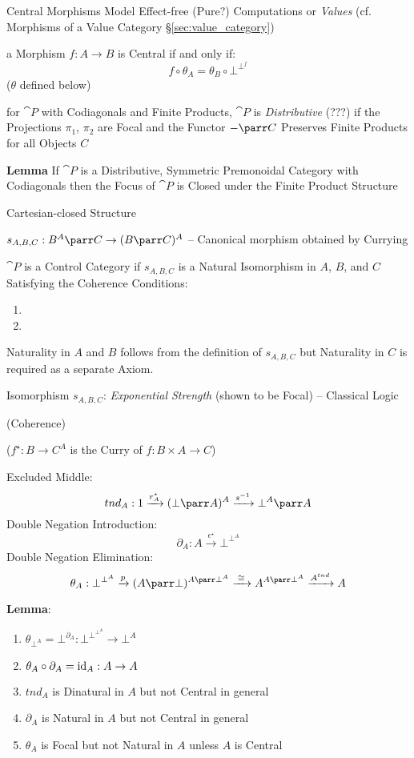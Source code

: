 Central Morphisms Model Effect-free (Pure?) Computations or
\emph{Values} (cf. Morphisms of a Value Category
\S\ref{sec:value_category})

a Morphism $f : A \rightarrow B$ is Central if and only if:
\[
  f \circ \theta_A = \theta_B \circ \bot^{\bot^f}
\]
($\theta$ defined below)

for $\cat{P}$ with Codiagonals and Finite Products, $\cat{P}$ is
\emph{Distributive} (???) if the Projections $\pi_1$, $\pi_2$ are
Focal and the Functor $-\parr C$ Preserves Finite Products for all
Objects $C$ %

\textbf{Lemma} If $\cat{P}$ is a Distributive, Symmetric Premonoidal
Category with Codiagonals then the Focus of $\cat{P}$ is Closed under
the Finite Product Structure

Cartesian-closed Structure

$s_{A,B,C} : B^A \parr C \rightarrow (B \parr C)^A$ -- Canonical
morphism obtained by Currying %

$\cat{P}$ is a Control Category if $s_{A,B,C}$ is a Natural
Isomorphism in $A$, $B$, and $C$ Satisfying the Coherence Conditions:
\begin{enumerate}
  \item
  \item
\end{enumerate}

\fist Naturality in $A$ and $B$ follows from the definition of
$s_{A,B,C}$ but Naturality in $C$ is required as a separate Axiom.

Isomorphism $s_{A,B,C}$: \emph{Exponential Strength} (shown to be
Focal) -- Classical Logic

(Coherence) %

($f^\star : B \rightarrow C^A$ is the Curry of $f : B \times A
\rightarrow C$)

Excluded Middle:
\[
  tnd_A : 1 \xrightarrow{r^\star_A} (\bot \parr A)^A
  \xrightarrow{s^{-1}} \bot^A \parr A
\]
Double Negation Introduction:
\[
  \partial_A : A \xrightarrow{\epsilon^\star} \bot^{\bot^A}
\]
Double Negation Elimination:
\[
  \theta_A : \bot^{\bot^A} \xrightarrow{p} (A \parr
  \bot)^{A\parr\bot^A} \xrightarrow{\;\cong\;} A^{A\parr\bot^A}
  \xrightarrow{A^{tnd}} A
\]

\textbf{Lemma}:
\begin{enumerate}
  \item $\theta_{\bot^A} = \bot^{\partial_A} : \bot^{\bot^{\bot^A}}
    \rightarrow \bot^A$
  \item $\theta_A \circ \partial_A = \mathrm{id}_A : A \rightarrow A$
  \item $tnd_A$ is Dinatural in $A$ but not Central in general
  \item $\partial_A$ is Natural in $A$ but not Central in general
  \item $\theta_A$ is Focal but not Natural in $A$ unless $A$ is
    Central %
\end{enumerate}

